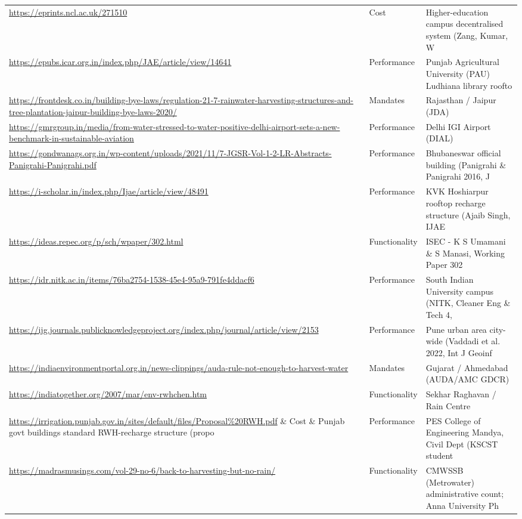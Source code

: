 {\begin{longtable}{p{9.2cm} p{2.5cm} p{4.2cm}}
\url{https://eprints.ncl.ac.uk/271510} & Cost & Higher-education campus decentralised system (Zang, Kumar, W\\
\url{https://epubs.icar.org.in/index.php/JAE/article/view/14641} & Performance & Punjab Agricultural University (PAU) Ludhiana library roofto\\
\url{https://frontdesk.co.in/building-bye-laws/regulation-21-7-rainwater-harvesting-structures-and-tree-plantation-jaipur-building-bye-laws-2020/} & Mandates & Rajasthan / Jaipur (JDA)\\
\url{https://gmrgroup.in/media/from-water-stressed-to-water-positive-delhi-airport-sets-a-new-benchmark-in-sustainable-aviation} & Performance & Delhi IGI Airport (DIAL)\\
\url{https://gondwanags.org.in/wp-content/uploads/2021/11/7-JGSR-Vol-1-2-LR-Abstracts-Panigrahi-Panigrahi.pdf} & Performance & Bhubaneswar official building (Panigrahi \& Panigrahi 2016, J\\
\url{https://i-scholar.in/index.php/Ijae/article/view/48491} & Performance & KVK Hoshiarpur rooftop recharge structure (Ajaib Singh, IJAE\\
\url{https://ideas.repec.org/p/sch/wpaper/302.html} & Functionality & ISEC - K S Umamani \& S Manasi, Working Paper 302\\
\url{https://idr.nitk.ac.in/items/76ba2754-1538-45e4-95a9-791fe4ddacf6} & Performance & South Indian University campus (NITK, Cleaner Eng \& Tech 4, \\
\url{https://ijg.journals.publicknowledgeproject.org/index.php/journal/article/view/2153} & Performance & Pune urban area city-wide (Vaddadi et al. 2022, Int J Geoinf\\
\url{https://indiaenvironmentportal.org.in/news-clippings/auda-rule-not-enough-to-harvest-water} & Mandates & Gujarat / Ahmedabad (AUDA/AMC GDCR)\\
\url{https://indiatogether.org/2007/mar/env-rwhchen.htm} & Functionality & Sekhar Raghavan / Rain Centre\\
\url{https://irrigation.punjab.gov.in/sites/default/files/Proposal%20RWH.pdf} & Cost & Punjab govt buildings standard RWH-recharge structure (propo\\
\url{https://kscst.org.in/spp/49_series/49s_spp/Poster_Presentation_Synopsis/49_49S_BE_3551.pdf} & Performance & PES College of Engineering Mandya, Civil Dept (KSCST student\\
\url{https://madrasmusings.com/vol-29-no-6/back-to-harvesting-but-no-rain/} & Functionality & CMWSSB (Metrowater) administrative count; Anna University Ph\\

\end{longtable}}
